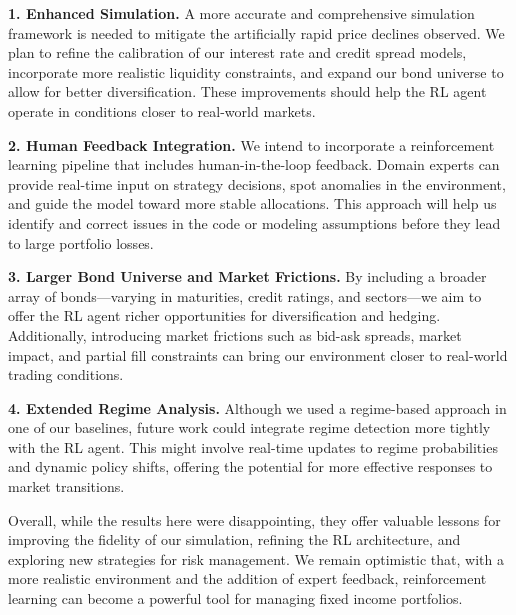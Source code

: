 \documentclass[
  a4paper,
  10pt,
  unnumberedsections,
  twoside,
]{LTJournalArticle}
\begin{document}
\textbf{1. Enhanced Simulation.} A more accurate and comprehensive simulation framework is needed to mitigate the artificially rapid price declines observed. We plan to refine the calibration of our interest rate and credit spread models, incorporate more realistic liquidity constraints, and expand our bond universe to allow for better diversification. These improvements should help the RL agent operate in conditions closer to real-world markets.

\textbf{2. Human Feedback Integration.} We intend to incorporate a reinforcement learning pipeline that includes human-in-the-loop feedback. Domain experts can provide real-time input on strategy decisions, spot anomalies in the environment, and guide the model toward more stable allocations. This approach will help us identify and correct issues in the code or modeling assumptions before they lead to large portfolio losses.

\textbf{3. Larger Bond Universe and Market Frictions.} By including a broader array of bonds—varying in maturities, credit ratings, and sectors—we aim to offer the RL agent richer opportunities for diversification and hedging. Additionally, introducing market frictions such as bid-ask spreads, market impact, and partial fill constraints can bring our environment closer to real-world trading conditions.

\textbf{4. Extended Regime Analysis.} Although we used a regime-based approach in one of our baselines, future work could integrate regime detection more tightly with the RL agent. This might involve real-time updates to regime probabilities and dynamic policy shifts, offering the potential for more effective responses to market transitions.

Overall, while the results here were disappointing, they offer valuable lessons for improving the fidelity of our simulation, refining the RL architecture, and exploring new strategies for risk management. We remain optimistic that, with a more realistic environment and the addition of expert feedback, reinforcement learning can become a powerful tool for managing fixed income portfolios.

\printbibliography
\end{document}
